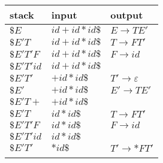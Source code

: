 \documentclass{standalone}
\providecommand\lightrule{%
	\arrayrulecolor{black!30}%
	\midrule[\lightrulewidth]%
	\arrayrulecolor{black}}
\begin{document}
\begin{tabularx}{\textwidth}{XXX}
    stack & input & output \\
    \midrule
        \(\$E\)
        &
        \(id + id * id\$\)
        &
        \(E \to TE'\)

        \\ \lightrule

        \(\$E'T\)
        &
        \(id + id * id\$\)
        &
        \(T \to FT'\)

        \\ \lightrule

        \(\$E'T'F\)
        &
        \(id + id * id\$\)
        &
        \(F \to id\)

        \\ \lightrule

        \(\$E'T'id\)
        &
        \(id + id * id\$\)
        &

        \\ \lightrule

        \(\$E'T'\)
        &
        \(+ id * id\$\)
        &
        \(T' \to \varepsilon\)

        \\ \lightrule

        \(\$E'\)
        &
        \(+ id * id\$\)
        &
        \(E' \to TE'\)

        \\ \lightrule

        \(\$E'T+\)
        &
        \(+ id * id\$\)
        &

        \\ \lightrule

        \(\$E'T\)
        &
        \(id * id\$\)
        &
        \(T \to FT'\)

        \\ \lightrule

        \(\$E'T'F\)
        &
        \(id * id\$\)
        &
        \(F \to id\)

        \\ \lightrule

        \(\$E'T'id\)
        &
        \(id * id\$\)
        &

        \\ \lightrule

        \(\$E'T'\)
        &
        \(* id\$\)
        &
        \(T' \to \ast FT'\)

        \\ \lightrule


\end{tabularx}
\end{document}

